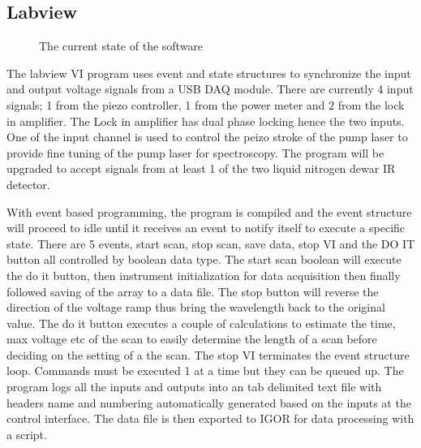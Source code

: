 \documentclass[a4paper]{book}
\newcommand{\imginput}[1]{} %
\begin{document}
		\subsection{Labview}

		\begin{figure} [!ht]
			\centering
			\resizebox{160mm}{!}{\imginput{images/labview-program.pdf_tex}}
			\caption{The current state of the software}
			\label{fig:labview-program}
		\end{figure}

		The labview VI program uses event and state structures to synchronize the input and output voltage signals from a USB DAQ module. There are currently 4 input signals; 1 from the piezo controller, 1 from the power meter and 2 from the lock in amplifier. The Lock in amplifier has dual phase locking hence the two inputs. One of the input channel is used to control the peizo stroke of the pump laser to provide fine tuning of the pump laser for spectroscopy. The program will be upgraded to accept signals from at least 1 of the two liquid nitrogen dewar IR detector. 
		
		With event based programming, the program is compiled and the event structure will proceed to idle until it receives an event to notify itself to execute a specific state. There are 5 events, start scan, stop scan, save data, stop VI and the DO IT button all controlled by boolean data type. The start scan boolean will execute the do it button, then instrument initialization for data acquisition then finally followed saving of the array to a data file. The stop button will reverse the direction of the voltage ramp thus bring the wavelength back to the original value. The do it button executes a couple of calculations to estimate the time, max voltage etc of the scan to easily determine the length of a scan before deciding on the setting of a the scan. The stop VI terminates the event structure loop. Commands must be executed 1 at a time but they can be queued up. The program logs all the inputs and outputs into an tab delimited text file with headers name and numbering automatically generated based on the inputs at the control interface. The data file is then exported to IGOR for data processing with a script. 
\end{document}
